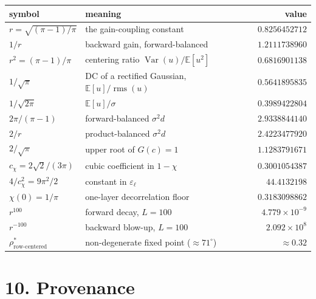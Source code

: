 \documentclass[10pt,a4paper]{article}
\newcommand{\E}{\mathbb{E}}
\newcommand{\Var}{\operatorname{Var}}
\newcommand{\rms}{\operatorname{rms}}
\newcommand{\rr}{r}
\begin{document}
\begin{center}\small
\begin{tabular}{@{}llr@{}}
\toprule
symbol & meaning & value \\
\midrule
$\rr=\sqrt{(\pi-1)/\pi}$ & the gain-coupling constant & $0.8256452712$ \\
$1/\rr$ & backward gain, forward-balanced & $1.2111738960$ \\
$\rr^2=(\pi-1)/\pi$ & centering ratio $\Var(u)/\E[u^2]$ & $0.6816901138$ \\
$1/\sqrt\pi$ & DC of a rectified Gaussian, $\E[u]/\rms(u)$ & $0.5641895835$ \\
$1/\sqrt{2\pi}$ & $\E[u]/\sigma$ & $0.3989422804$ \\
$2\pi/(\pi-1)$ & forward-balanced $\sigma^2 d$ & $2.9338844140$ \\
$2/\rr$ & product-balanced $\sigma^2 d$ & $2.4223477920$ \\
$2/\sqrt\pi$ & upper root of $G(c)=1$ & $1.1283791671$ \\
$c_\chi=2\sqrt2/(3\pi)$ & cubic coefficient in $1-\chi$ & $0.3001054387$ \\
$4/c_\chi^2=9\pi^2/2$ & constant in $\varepsilon_\ell$ & $44.4132198$ \\
$\chi(0)=1/\pi$ & one-layer decorrelation floor & $0.3183098862$ \\
$\rr^{100}$ & forward decay, $L=100$ & $4.779\times10^{-9}$ \\
$\rr^{-100}$ & backward blow-up, $L=100$ & $2.092\times10^{8}$ \\
$\rho^\ast_{\text{row-centered}}$ & non-degenerate fixed point ($\approx71^\circ$) & $\approx0.32$ \\
\bottomrule
\end{tabular}
\end{center}

\section*{10. Provenance}
\end{document}
